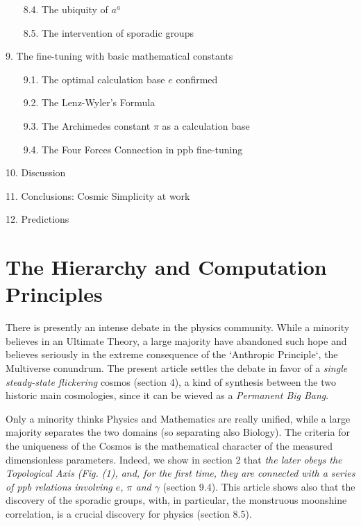 \documentclass[twoside,draft]{article}
\begin{document}
\begin{sloppypar}
~~~    8.4. The ubiquity of $a^a$
   
~~~    8.5. The intervention of sporadic groups
   
 9. The fine-tuning with basic mathematical constants
 
~~~    9.1. The optimal calculation base $e$ confirmed
   
~~~    9.2. The Lenz-Wyler's Formula
   
~~~    9.3. The Archimedes constant $\pi$ as a calculation base
   
~~~    9.4. The Four Forces Connection in ppb fine-tuning
  
 10. Discussion
 
 11. Conclusions: Cosmic Simplicity at work
 
 12. Predictions


\section {The Hierarchy and Computation Principles}

There is presently an intense debate in the physics community. While a minority believes in an Ultimate Theory, a large majority have abandoned such hope and believes seriously in the extreme consequence of the `Anthropic Principle`, the Multiverse conundrum\cite{Carr}. The present article settles the debate in favor of a \textit{single steady-state flickering} cosmos (section 4), a kind of synthesis between the two historic main cosmologies, since it can be wieved as a \textit{Permanent Big Bang}.

Only a minority thinks Physics and Mathematics are really unified, while a large majority separates the two domains (so separating also Biology). The criteria for the uniqueness of the Cosmos is the mathematical character of the measured dimensionless parameters. Indeed, we show in section 2 that \textit{the later obeys the Topological Axis (Fig. (1), and, for the first time, they are connected with a series of ppb relations involving $e$, $\pi$ and $\gamma$} (section 9.4). This article shows also that the discovery of the sporadic groups, with, in particular, the monstruous moonshine correlation\cite{Borcherds}, is a crucial discovery for physics (section 8.5).


\end{sloppypar}
\end{document}
